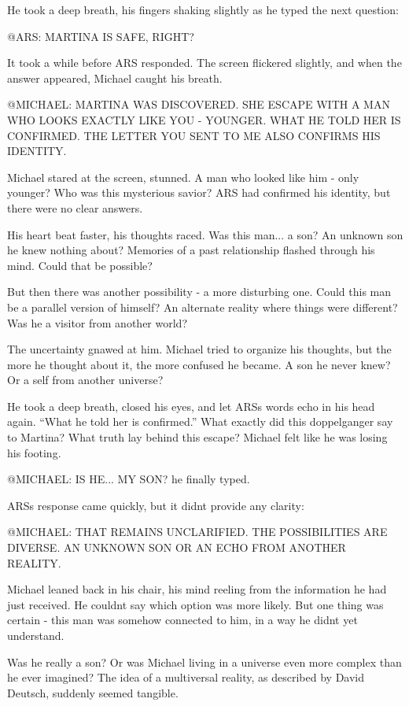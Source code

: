 \documentclass[
]{article}
\begin{document}
He took a deep breath, his fingers shaking slightly as he typed the next
question:

@ARS: MARTINA IS SAFE, RIGHT?

It took a while before ARS responded. The screen flickered slightly, and
when the answer appeared, Michael caught his breath.

@MICHAEL: MARTINA WAS DISCOVERED. SHE ESCAPE WITH A MAN WHO LOOKS
EXACTLY LIKE YOU - YOUNGER. WHAT HE TOLD HER IS CONFIRMED. THE LETTER
YOU SENT TO ME ALSO CONFIRMS HIS IDENTITY.

Michael stared at the screen, stunned. A man who looked like him - only
younger? Who was this mysterious savior? ARS had confirmed his identity,
but there were no clear answers.

His heart beat faster, his thoughts raced. Was this man... a son? An
unknown son he knew nothing about? Memories of a past relationship
flashed through his mind. Could that be possible?

But then there was another possibility - a more disturbing one. Could
this man be a parallel version of himself? An alternate reality where
things were different? Was he a visitor from another world?

The uncertainty gnawed at him. Michael tried to organize his thoughts,
but the more he thought about it, the more confused he became. A son he
never knew? Or a self from another universe?

He took a deep breath, closed his eyes, and let ARS\textquotesingle s
words echo in his head again. ``What he told her is confirmed.'' What
exactly did this doppelganger say to Martina? What truth lay behind this
escape? Michael felt like he was losing his footing.

@MICHAEL: IS HE... MY SON? he finally typed.

ARS\textquotesingle s response came quickly, but it
didn\textquotesingle t provide any clarity:

@MICHAEL: THAT REMAINS UNCLARIFIED. THE POSSIBILITIES ARE DIVERSE. AN
UNKNOWN SON OR AN ECHO FROM ANOTHER REALITY.

Michael leaned back in his chair, his mind reeling from the information
he had just received. He couldn\textquotesingle t say which option was
more likely. But one thing was certain - this man was somehow connected
to him, in a way he didn\textquotesingle t yet understand.

Was he really a son? Or was Michael living in a universe even more
complex than he ever imagined? The idea of \hspace{0pt}\hspace{0pt}a
multiversal reality, as described by David Deutsch, suddenly seemed
tangible.
\end{document}
